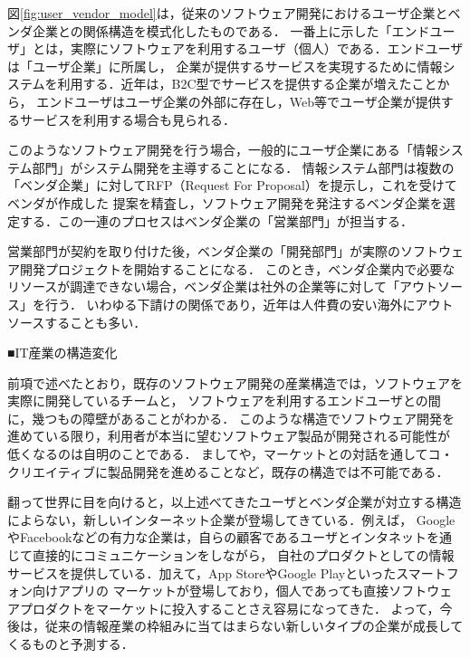\documentclass[11pt,a4paper,twoside]{jarticle}
\newcommand{\研究種別}{A}	%
\newcommand{\研究課題名}{コ・クリエイティブなソフトウェア開発者を育成するPBL型教育}
\newcommand{\研究機関名}{産業技術大学院大学}
\newcommand{\研究代表者氏名}{中鉢　欣秀}
\newcommand{\研究代表者氏名ふりがな}{ちゅうばち　よしひで}
\newcommand{\本応募effort}{\KLEffort{18}}	%
\newcommand{\研究期間の最終元号年度}{27}	%
\begin{document}
{    図\ref{fig:user_vendor_model}は，従来のソフトウェア開発におけるユーザ企業とベンダ企業との関係構造を模式化したものである．
    一番上に示した「エンドユーザ」とは，実際にソフトウェアを利用するユーザ（個人）である．エンドユーザは「ユーザ企業」に所属し，
    企業が提供するサービスを実現するために情報システムを利用する．近年は，B2C型でサービスを提供する企業が増えたことから，
    エンドユーザはユーザ企業の外部に存在し，Web等でユーザ企業が提供するサービスを利用する場合も見られる．
    
    このようなソフトウェア開発を行う場合，一般的にユーザ企業にある「情報システム部門」がシステム開発を主導することになる．
    情報システム部門は複数の「ベンダ企業」に対してRFP（Request For Proposal）を提示し，これを受けてベンダが作成した
    提案を精査し，ソフトウェア開発を発注するベンダ企業を選定する．この一連のプロセスはベンダ企業の「営業部門」が担当する．
    
    営業部門が契約を取り付けた後，ベンダ企業の「開発部門」が実際のソフトウェア開発プロジェクトを開始することになる．
    このとき，ベンダ企業内で必要なリソースが調達できない場合，ベンダ企業は社外の企業等に対して「アウトソース」を行う．
    いわゆる下請けの関係であり，近年は人件費の安い海外にアウトソースすることも多い．
    
	\begin{flushleft}
		■IT産業の構造変化
	\end{flushleft}

    前項で述べたとおり，既存のソフトウェア開発の産業構造では，ソフトウェアを実際に開発しているチームと，
    ソフトウェアを利用するエンドユーザとの間に，幾つもの障壁があることがわかる．
    このような構造でソフトウェア開発を進めている限り，利用者が本当に望むソフトウェア製品が開発される可能性が
    低くなるのは自明のことである．
    ましてや，マーケットとの対話を通してコ・クリエイティブに製品開発を進めることなど，既存の構造では不可能である．
    
    翻って世界に目を向けると，以上述べてきたユーザとベンダ企業が対立する構造によらない，新しいインターネット企業が登場してきている．例えば，
    GoogleやFacebookなどの有力な企業は，自らの顧客であるユーザとインタネットを通じて直接的にコミュニケーションをしながら，
    自社のプロダクトとしての情報サービスを提供している．加えて，App StoreやGoogle Playといったスマートフォン向けアプリの
    マーケットが登場しており，個人であっても直接ソフトウェアプロダクトをマーケットに投入することさえ容易になってきた．
    よって，今後は，従来の情報産業の枠組みに当てはまらない新しいタイプの企業が成長してくるものと予測する．
    
}
\end{document}
